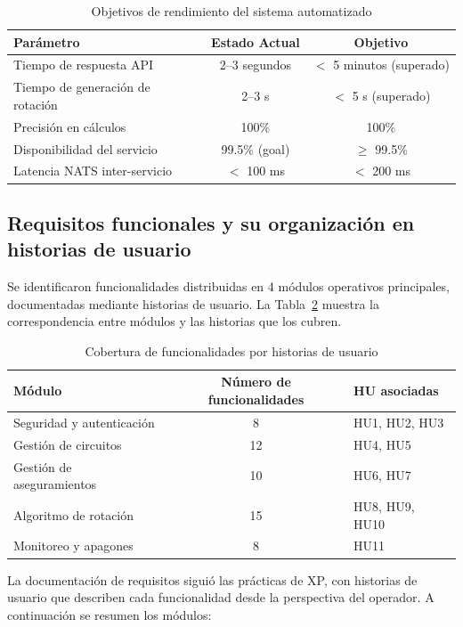 \begin{table}[H]
\centering
\caption{Objetivos de rendimiento del sistema automatizado}
\label{tab:objetivos_rendimiento}
\begin{tabular}{|l|c|c|}
\hline
\textbf{Parámetro} & \textbf{Estado Actual} & \textbf{Objetivo} \\ \hline
Tiempo de respuesta API & 2--3 segundos & $<$ 5 minutos (superado) \\ \hline
Tiempo de generación de rotación & 2--3 s & $<$ 5 s (superado) \\ \hline
Precisión en cálculos & 100\% & 100\% \\ \hline
Disponibilidad del servicio & 99.5\% (goal) & $\geq$ 99.5\% \\ \hline
Latencia NATS inter-servicio & $<$ 100 ms & $<$ 200 ms \\ \hline
\hline
\end{tabular}
\end{table}

\subsection{Requisitos funcionales y su organización en historias de usuario}
Se identificaron funcionalidades distribuidas en 4 módulos operativos principales, documentadas mediante historias de usuario. La Tabla~\ref{tab:hu_coverage} muestra la correspondencia entre módulos y las historias que los cubren.

\begin{table}[H]
\centering
\caption{Cobertura de funcionalidades por historias de usuario}
\label{tab:hu_coverage}
\begin{tabular}{|l|c|l|}
\hline
\textbf{Módulo} & \textbf{Número de funcionalidades} & \textbf{HU asociadas} \\ \hline
Seguridad y autenticación & 8 & HU1, HU2, HU3 \\ \hline
Gestión de circuitos & 12 & HU4, HU5 \\ \hline
Gestión de aseguramientos & 10 & HU6, HU7 \\ \hline
Algoritmo de rotación & 15 & HU8, HU9, HU10 \\ \hline
Monitoreo y apagones & 8 & HU11 \\ \hline
\end{tabular}
\end{table}

La documentación de requisitos siguió las prácticas de XP, con historias de usuario que describen cada funcionalidad desde la perspectiva del operador. A continuación se resumen los módulos:

